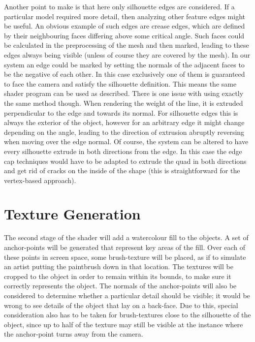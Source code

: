 \documentclass[a4paper, 12pt]{article}
\begin{document}
Another point to make is that here only silhouette edges are considered. If a particular model required more detail, then analyzing other feature edges might be useful. An obvious example of such edges are crease edges, which are defined by their neighbouring faces differing above some critical angle. Such faces could be calculated in the preprocessing of the mesh and then marked, leading to these edges always being visible (unless of course they are covered by the mesh). In our system an edge could be marked by setting the normals of the adjacent faces to be the negative of each other. In this case exclusively one of them is guaranteed to face the camera and satisfy the silhouette definition. This means the same shader program can be used as described. There is one issue with using exactly the same method though. When rendering the weight of the line, it is extruded perpendicular to the edge and towards its normal. For silhouette edges this is always the exterior of the object, however for an arbitrary edge it might change depending on the angle, leading to the direction of extrusion abruptly reversing when moving over the edge normal. Of course, the system can be altered to have every silhouette extrude in both directions from the edge. In this case the edge cap techniques would have to be adapted to extrude the quad in both directions and get rid of cracks on the inside of the shape (this is straightforward for the vertex-based approach).



\section{Texture Generation}

The second stage of the shader will add a watercolour fill to the objects. A set of anchor-points will be generated that represent key areas of the fill. Over each of these points in screen space, some brush-texture will be placed, as if to simulate an artist putting the paintbrush down in that location. The textures will be cropped to the object in order to remain within its bounds, to make sure it correctly represents the object. The normals of the anchor-points will also be considered to determine whether a particular detail should be visible; it would be wrong to see details of the object that lay on a back-face. Due to this, special consideration also has to be taken for brush-textures close to the silhouette of the object, since up to half of the texture may still be visible at the instance where the anchor-point turns away from the camera.
\end{document}

